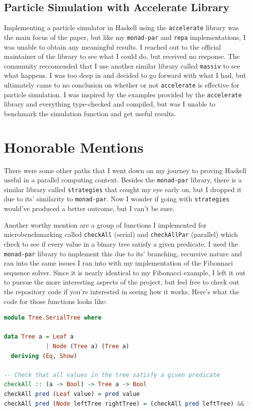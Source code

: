 \documentclass[a4paper, 10pt]{article}
\begin{document}
\subsection{Particle Simulation with Accelerate Library}

Implementing a particle simulator in Haskell using the \lstinline{accelerate} library was the main focus of the paper, but like my \lstinline{monad-par} and \lstinline{repa} implementations, I was unable to obtain any meaningful results. I reached out to the official maintainer of the library to see what I could do, but received no response. The community reccomended that I use another similar library called \lstinline{massiv} to see what happens. I was too deep in and decided to go forward with what I had, but ultimately came to no conclusion on whether or not \lstinline{accelerate} is effective for particle simulation. I was inspired by the examples provided by the \lstinline{accelerate} library and everything type-checked and compiled, but was I unable to benchmark the simulation function and get useful results.

\section{Honorable Mentions}

There were some other paths that I went down on my journey to proving Haskell useful in a parallel computing context. Besides the  \lstinline{monad-par} library, there is a similar library called \lstinline{strategies} that cought my eye early on, but I dropped it due to its' similarity to \lstinline{monad-par}. Now I wonder if going with \lstinline{strategies} would've produced a better outcome, but I can't be sure.

Another worthy mention are a group of functions I implemented for microbenchmarking called \lstinline{checkAll} (serial) and \lstinline{checkAllPar} (parallel) which check to see if every value in a binary tree satisfy a given predicate. I used the \lstinline{monad-par} library to implement this due to its' branching, recursive nature and ran into the same issues I ran into with my implementation of the Fibonnaci sequence solver. Since it is nearly identical to my Fibonacci example, I left it out to pursue the more interesting aspects of the project, but feel free to check out the repository code if you're interested in seeing how it works. Here's what the code for those functions looks like:

\begin{lstlisting}[language=Haskell, caption=Serial Tree check]
module Tree.SerialTree where

data Tree a = Leaf a
            | Node (Tree a) (Tree a)
  deriving (Eq, Show)

-- Check that all values in the tree satisfy a given predicate
checkAll :: (a -> Bool) -> Tree a -> Bool
checkAll pred (Leaf value) = pred value
checkAll pred (Node leftTree rightTree) = (checkAll pred leftTree) && (checkAll pred rightTree)
\end{lstlisting}
\end{document}

